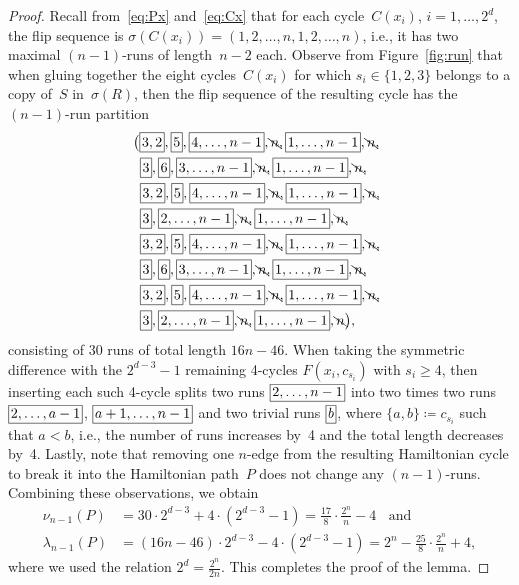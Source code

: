 \documentclass[11pt]{article}
\newcommand{\ass}{\coloneqq}
\newcommand*{\mybox}[1]{%
  \framebox{\raisebox{0pt}[0.45\baselineskip][0.05\baselineskip]{%
    $\!#1\!$}}}
\begin{document}
\begin{proof}
Recall from~\eqref{eq:Px} and~\eqref{eq:Cx} that for each cycle~$C(x_i)$, $i=1,\ldots,2^d$, the flip sequence is $\sigma(C(x_i))=(1,2,\ldots,n,1,2,\ldots,n)$, i.e., it has two maximal $(n-1)$-runs of length~$n-2$ each.
Observe from Figure~\ref{fig:run} that when gluing together the eight cycles~$C(x_i)$ for which $s_i\in\{1,2,3\}$ belongs to a copy of~$S$ in~$\sigma(R)$, then the flip sequence of the resulting cycle has the $(n-1)$-run partition
\begin{alignat*}{8}
   & \!\!\!\big(\mybox{3,2},\mybox{5},\mybox{4,\dots,n-1},\bcancel{n},\mybox{1,\dots,n-1},\bcancel{n}, \\
   & \mybox{3},\mybox{6},\mybox{3,\dots,n-1},\bcancel{n},\mybox{1,\dots,n-1},\bcancel{n}, \\
   & \mybox{3,2},\mybox{5},\mybox{4,\dots,n-1},\bcancel{n},\mybox{1,\dots,n-1},\bcancel{n}, \\
   & \mybox{3},\mybox{2,\dots,n-1},\bcancel{n},\mybox{1,\dots,n-1},\bcancel{n},\\
   & \mybox{3,2},\mybox{5},\mybox{4,\dots,n-1},\bcancel{n},\mybox{1,\dots,n-1},\bcancel{n}, \\
   & \mybox{3},\mybox{6},\mybox{3,\dots,n-1},\bcancel{n},\mybox{1,\dots,n-1},\bcancel{n},\\
   & \mybox{3,2},\mybox{5},\mybox{4,\dots,n-1},\bcancel{n},\mybox{1,\dots,n-1},\bcancel{n},\\
   & \mybox{3},\mybox{2,\dots,n-1},\bcancel{n},\mybox{1,\dots,n-1},\bcancel{n}\big),
\end{alignat*}
consisting of 30 runs of total length $16n-46$.
%
When taking the symmetric difference with the $2^{d-3}-1$ remaining 4-cycles $F(x_i,c_{s_i})$ with $s_i\geq 4$, then inserting each such 4-cycle splits two runs $\mybox{2,\dots,n-1}$ into two times two runs $\mybox{2,\dots,a-1}$, $\mybox{a+1,\dots,n-1}$ and two trivial runs $\mybox{b}$, where $\{a,b\}\ass c_{s_i}$ such that $a<b$, i.e., the number of runs increases by~4 and the total length decreases by~4.
%
Lastly, note that removing one $n$-edge from the resulting Hamiltonian cycle to break it into the Hamiltonian path~$P$ does not change any $(n-1)$-runs.
%
Combining these observations, we obtain
\begin{equation*}
\begin{split}
\nu_{n-1}(P) &= 30\cdot 2^{d-3}+4\cdot(2^{d-3}-1)=\frac{17}{8}\cdot\frac{2^n}{n}-4 \;\;\text{ and } \\
\lambda_{n-1}(P) &= (16n-46)\cdot2^{d-3}-4\cdot(2^{d-3}-1)=2^n-\frac{25}{8}\cdot \frac{2^n}{n}+4,
\end{split}
\end{equation*}
where we used the relation $2^d=\frac{2^n}{2n}$.
This completes the proof of the lemma.
\end{proof}
\end{document}
